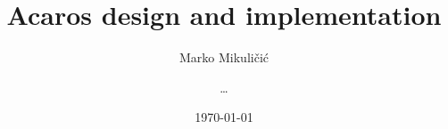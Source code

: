 \title{Acaros design and implementation}
\author{Marko Mikuli\v{c}i\'c \and \ldots }
\date{\today}


\newcommand{\acaros}{\textsf{Acaros}\ }
\newcommand{\kaos}{\textsf{Kaos}\ }

\newcommand{\unix}{UNIX\texttrademark}
\newcommand{\windows}{Windows\texttrademark}
\newcommand{\solaris}{Solaris\texttrademark}

\newcommand{\todo}{\textbf{TODO}\ }
